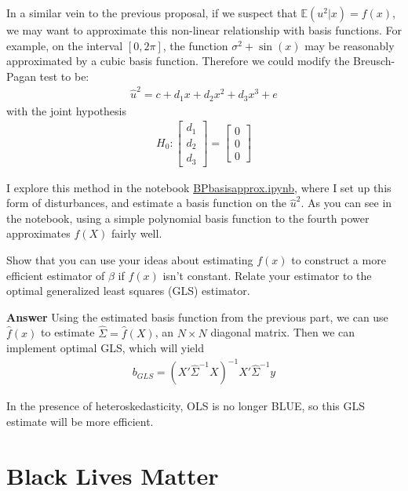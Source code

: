 \documentclass[11pt]{exam}
\begin{document}
\begin{questions}
In a similar vein to the previous proposal, if we suspect that
\(\mathbb{E}(u^2|x) = f(x)\), we may want to approximate this non-linear
relationship with basis functions. For example, on the interval
\([0, 2\pi]\), the function \(\sigma^2 + \sin(x)\) may be reasonably
approximated by a cubic basis function. Therefore we could modify the
Breusch-Pagan test to be:
\begin{align*}\hat{u}^2 = c + d_1x + d_2x^2 + d_3x^3 + e\end{align*}
with the joint hypothesis
\begin{align*}H_0: \begin{bmatrix} d_1 \\ d_2 \\ d_3 \end{bmatrix} = \begin{bmatrix} 0 \\ 0\\ 0 \end{bmatrix}\end{align*}

I explore this method in the notebook \href{https://github.com/lghackett/are212_finalexam/blob/master/BP_basis_approx.ipynb}{BP\textunderscore basis\textunderscore approx.ipynb}, where I set up this form of disturbances, and estimate a basis function on the $\hat{u}^2$. As you can see in the notebook, using a simple polynomial basis function to the fourth power approximates $f(X)$ fairly well.

    \question Show that you can use your ideas about estimating \(f(x)\)
to construct a more efficient estimator of \(\beta\) if \(f(x)\) isn't
constant. Relate your estimator to the optimal generalized least squares
(GLS) estimator.

\textbf{Answer} Using the estimated basis function from the previous part, we can use $\hat{f}(x)$ to estimate $\hat{\Sigma} = \hat{f}(X)$, an $N\times N$ diagonal matrix. Then we can implement optimal GLS, which will yield
\begin{align*}
b_{GLS} = (X'\hat{\Sigma}^{-1}X)^{-1}X'\hat{\Sigma}^{-1}y
\end{align*}

In the presence of heteroskedasticity, OLS is no longer BLUE, so this GLS estimate will be more efficient. 


\end{questions}

    \hypertarget{black-lives-matter}{%
\section{Black Lives Matter}\label{black-lives-matter}}
\end{document}
